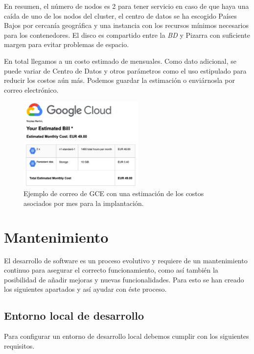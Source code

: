 \documentclass[11pt,spanish,listoffigures,listoftables]{tfgetsinf}
\begin{document}
En resumen, el número de nodos es 2 para tener servicio en caso de que haya una caída de uno de los nodos del cluster, el centro de datos se ha escogido Países Bajos por cercanía geográfica y una instancia con los recursos mínimos necesarios para los contenedores. El disco es compartido entre la \textit{BD} y Pizarra con suficiente margen para evitar problemas de espacio.

En total llegamos a un costo estimado de  mensuales. Como dato adicional, se puede variar de Centro de Datos y otros parámetros como el uso estipulado para reducir los costos aún más. Podemos guardar la estimación o enviárnosla por correo electrónico.


\begin{figure}[ht]
	\centering
	\includegraphics[width=0.55\textwidth]{img/google-cloud-engine-estimated-cost}
	\caption[Estimación de costos en GCE]{Ejemplo de correo de GCE con una estimación de los costos asociados por mes para la implantación.}
	\label{figura:gce-estimated-cost-email}
\end{figure}

\chapter{Mantenimiento}

El desarrollo de software es un proceso evolutivo y requiere de un mantenimiento continuo para asegurar el correcto funcionamiento, como así también la posibilidad de añadir mejoras y nuevas funcionalidades. Para esto se han creado los siguientes apartados y así ayudar con éste proceso.

\section{Entorno local de desarrollo}

Para configurar un entorno de desarrollo local debemos cumplir con los siguientes requisitos.
\end{document}
